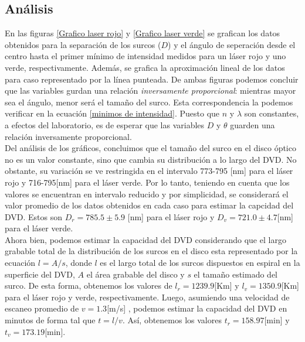 \documentclass[10pt,a4paper]{article}
\begin{document}
	\begin{multicols}{2}
	\section{Análisis}
	En las figuras \ref{Grafico laser rojo} y \ref{Grafico laser verde} se grafican los datos obtenidos para la separación de los surcos ($D$) y el ángulo de seperación desde el centro hasta el primer mínimo de intensidad  medidos para un láser rojo y uno verde, respectivamente. Además, se grafica la aproximación lineal de los datos para caso representado por la línea punteada. De ambas figuras podemos concluir que las variables gurdan una relación \emph{inversamente proporcional}: mientras mayor sea el ángulo, menor  será el tamaño del surco. Esta correspondencia la podemos verificar en la ecuación \ref{minimos de intensidad}. Puesto que $n$ y $\lambda$ son constantes, a efectos del laboratorio, es de esperar que las variables $D$ y $\theta$ guarden una relación inversamente proporcional.\\
	
	Del análisis de los gráficos, concluimos que el tamaño del surco en el disco óptico no es un valor constante, sino que cambia su distribución a lo largo del DVD. No obstante, su variación se ve restringida en el intervalo 773-795 [nm] para el láser rojo y 716-795[nm] para el láser verde. Por lo tanto, teniendo en cuenta que los valores se encuentran en intervalo reducido y por simplicidad, se considerará el valor promedio de los datos obtenidos en cada caso para estimar la capcidad del DVD. Estos son $D_r =785.5 \pm 5.9$ [nm] para el láser rojo y $D_v = 721.0 \pm  4.7$[nm] para el láser verde.\\
	
	Ahora bien, podemos estimar la capacidad del DVD considerando que el largo grabable total de la distribución de los surcos en el disco esta representado por la ecuación \textit{$l = A/s$}, donde $l$ es el largo total de los surcos dispuestos en espiral en la superficie del DVD, $A$ el área grabable del disco y $s$ el tamaño estimado del surco. De esta forma, obtenemos los valores de $l_r = 1239.9$[Km]  y $l_v = 1350.9$[Km] para el láser rojo y verde, respectivamente. Luego, asumiendo una velocidad de escaneo promedio de $v = 1.3$[m/s] \cite{wikiCD}, podemos estimar la capacidad del DVD en minutos de forma tal que \textit{$t = l/v$}. Así, obtenemos los valores $t_r = 158.97$[min] y $t_v = 173.19$[min].\\
	

\end{multicols}
\end{document}
